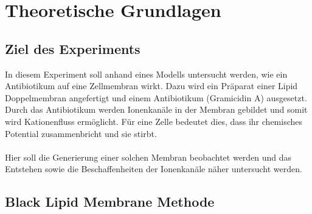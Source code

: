 \documentclass{include/thesisclass3}
\begin{document}
	\FrontMatter
	
	\tableofcontents                  
	\newpage
	\MainMatter


\chapter{Theoretische Grundlagen}
\section{Ziel des Experiments}
In diesem Experiment soll anhand eines Modells untersucht werden, wie ein Antibiotikum auf eine Zellmembran wirkt. Dazu wird ein Präparat einer Lipid Doppelmembran angefertigt und einem Antibiotikum (Gramicidin A) ausgesetzt. Durch das Antibiotikum werden Ionenkanäle in der Membran gebildet und somit wird Kationenfluss ermöglicht. Für eine Zelle bedeutet dies, dass ihr chemisches Potential zusammenbricht und sie stirbt.\\
\\
Hier soll die Generierung einer solchen Membran beobachtet werden und das Entstehen sowie die Beschaffenheiten der Ionenkanäle näher untersucht werden.


\section{Black Lipid Membrane Methode}
\end{document}
